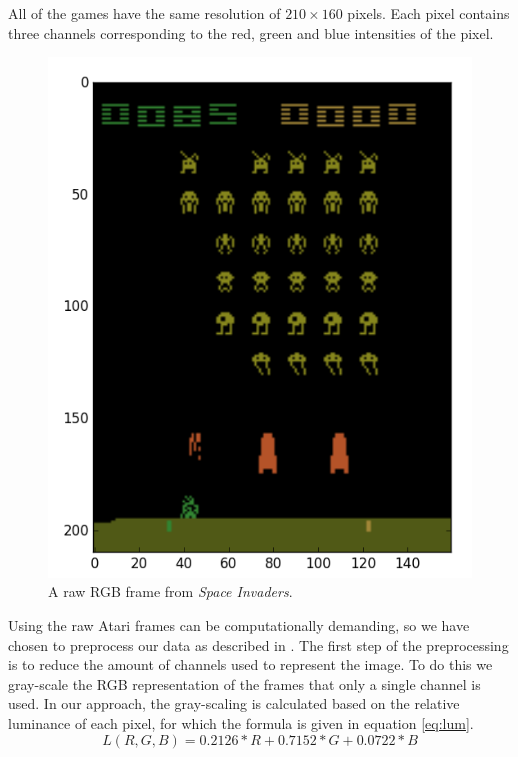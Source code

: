 \documentclass[11pt]{article}
\begin{document}
All of the games have the same resolution of $210 \times 160$ pixels.
Each pixel contains three channels corresponding to the red, green and blue intensities of the pixel.
\begin{figure}[!h]
    \centering
    \includegraphics[scale=0.35]{include/space_invaders_1.png}
    \caption{A raw RGB frame from \textit{Space Invaders}.}
    \label{fig:si}
\end{figure}

Using the raw Atari frames can be computationally demanding, so we have chosen
to preprocess our data as described in \cite{dqn}. 
The first step of the preprocessing is to reduce the amount of channels used to
represent the image.
To do this we gray-scale the RGB representation of the frames that only a single channel is used.
In our approach, the gray-scaling is calculated based on the relative luminance\cite{luminance} of each pixel,
for which the formula is given in equation \ref{eq:lum}.
\begin{equation}\label{eq:lum}
    L(R, G, B) = 0.2126*R + 0.7152*G + 0.0722*B
\end{equation}
\end{document}
